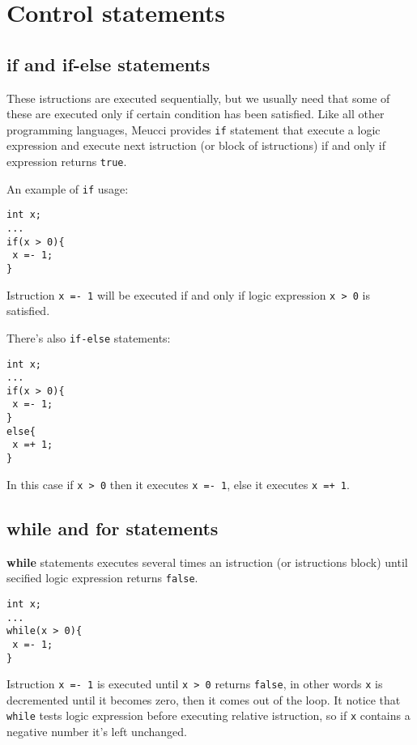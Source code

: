 \documentclass[10pt]{book}%
\newcommand{\code}[1]{\texttt{#1}}
\renewcommand{\emph}[1]{\textbf{#1}}
\newenvironment{codeenv}{
\begin{mdframed}[backgroundcolor=black!20,topline=false,leftline=false,rightline=false,bottomline=false]
}
{\end{mdframed}}
\begin{document}
\section{Control statements}
\subsection{if and if-else statements}
These istructions are executed sequentially, but we usually need that some of these are executed only if certain condition has been satisfied. Like all other programming languages, Meucci provides \code{if} statement that execute a logic expression and execute next istruction (or block of istructions) if and only if expression returns \code{true}.

An example of \code{if} usage:

\begin{codeenv}
\begin{verbatim}
int x;
...
if(x > 0){
 x =- 1;
}
\end{verbatim}
\end{codeenv}

Istruction \code{x =- 1} will be executed if and only if logic expression \code{x > 0} is satisfied.

There's also \code{if-else} statements:
\begin{codeenv}
\begin{verbatim}
int x;
...
if(x > 0){
 x =- 1;
}
else{
 x =+ 1;
}
\end{verbatim}
\end{codeenv}
In this case if \code{x > 0} then it executes \code{x =- 1}, else it executes \code{x =+ 1}.

\subsection{while and for statements}
\emph{while} statements executes several times an istruction (or istructions block) until secified logic expression returns \code{false}.
\begin{codeenv}
\begin{verbatim}
int x;
...
while(x > 0){
 x =- 1;
}
\end{verbatim}
\end{codeenv}
Istruction \code{x =- 1} is executed until \code{x > 0} returns \code{false}, in other words \code x is decremented until it becomes zero, then it comes out of the loop. It notice that \code{while} tests logic expression before executing relative istruction, so if \code x contains a negative number it's left unchanged.
\end{document}
